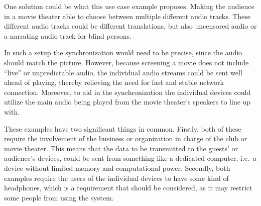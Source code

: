 \begin{description}
        One solution could be what this use case example proposes.
        Making the audience in a movie theater able to choose between multiple different audio tracks.
        These different audio tracks could be different translations, but also uncensored audio or a narrating audio track for blind persons.

        In such a setup the synchronization would need to be precise, since the audio should match the picture.
        However, because screening a movie does not include \enquote{live} or unpredictable audio, the individual audio streams could be sent well ahead of playing,
        thereby relieving the need for fast and stable network connection.
        Moreover, to aid in the synchronization the individual devices could utilize the main audio being played from the movie theater's speakers to line up with.
\end{description}

These examples have two significant things in common.
Firstly, both of these require the involvement of the business or organization in charge of the club or movie theater.
This means that the data to be transmitted to the guests' or audience's devices, could be sent from something like a dedicated computer, i.e.~a device without limited memory and computational power.
Secondly, both examples require the users of the individual devices to have some kind of headphones, which is a requirement that should be considered, as it may restrict some people from using the system.
